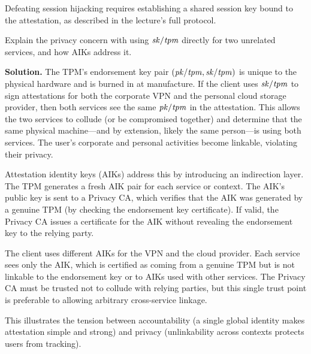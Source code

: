 \documentclass[11pt]{article}
\newcommand{\pk}[1]{\ensuremath{\mi{pk/#1}}}
\newcommand{\sk}[1]{\ensuremath{\mi{sk/#1}}}
\begin{document}
Defeating session hijacking requires establishing a shared session key
bound to the attestation, as described in the lecture's full protocol.

\begin{task}\rm
  Explain the privacy concern with using $\sk{tpm}$ directly for two
  unrelated services, and how AIKs address it.
\end{task}

\noindent\textbf{Solution.}
The TPM's endorsement key pair $(\pk{tpm}, \sk{tpm})$ is unique to the
physical hardware and is burned in at manufacture.  If the client uses
$\sk{tpm}$ to sign attestations for both the corporate VPN and the
personal cloud storage provider, then both services see the same
$\pk{tpm}$ in the attestation.  This allows the two services to
collude (or be compromised together) and determine that the same
physical machine---and by extension, likely the same person---is using
both services.  The user's corporate and personal activities become
linkable, violating their privacy.

Attestation identity keys (AIKs) address this by introducing an
indirection layer.  The TPM generates a fresh AIK pair for each
service or context.  The AIK's public key is sent to a Privacy CA,
which verifies that the AIK was generated by a genuine TPM (by
checking the endorsement key certificate).  If valid, the Privacy CA
issues a certificate for the AIK without revealing the endorsement key
to the relying party.

The client uses different AIKs for the VPN and the cloud provider.
Each service sees only the AIK, which is certified as coming from a
genuine TPM but is not linkable to the endorsement key or to AIKs used
with other services.  The Privacy CA must be trusted not to collude
with relying parties, but this single trust point is preferable to
allowing arbitrary cross-service linkage.

This illustrates the tension between accountability (a single global
identity makes attestation simple and strong) and privacy
(unlinkability across contexts protects users from tracking).
\end{document}
